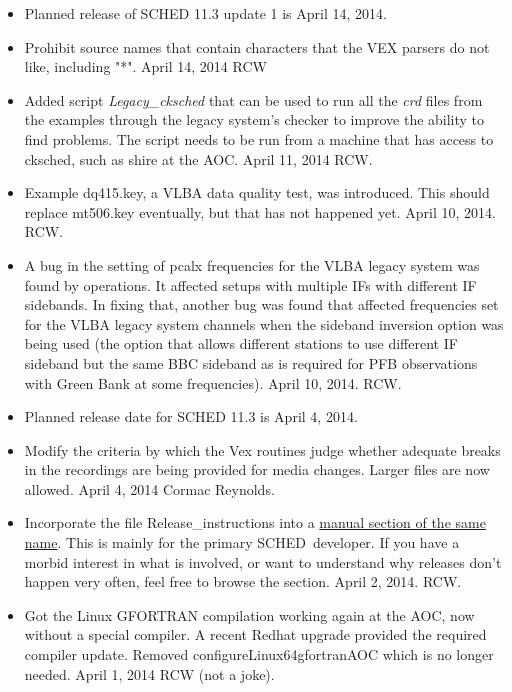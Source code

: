 \documentclass{report}
\newcommand{\schedb}{{\sc SCHED~}}
\begin{document}
\begin{itemize}

\item Planned release of SCHED 11.3 update 1 is April 14, 2014.

\item Prohibit source names that contain characters that the VEX
parsers do not like, including "*".  April 14, 2014  RCW

\item Added script {\sl Legacy\_cksched} that can be used to run all
the {\sl crd} files from the examples through the legacy system's
checker to improve the ability to find problems.  The script needs
to be run from a machine that has access to cksched, such as shire
at the AOC.  April 11, 2014 RCW.

\item Example dq415.key, a VLBA data quality test, was introduced.
This should replace mt506.key eventually, but that has not happened
yet. April 10, 2014.  RCW.

\item A bug in the setting of pcalx frequencies for the VLBA legacy
system was found by operations.  It affected setups with multiple IFs
with different IF sidebands.  In fixing that, another bug was found
that affected frequencies set for the VLBA legacy system channels when
the sideband inversion option was being used (the option that allows
different stations to use different IF sideband but the same BBC
sideband as is required for PFB observations with Green Bank at some
frequencies).  April 10, 2014.  RCW.

\item Planned release date for SCHED 11.3 is April 4, 2014.

\item Modify the criteria by which the Vex routines judge whether 
adequate breaks in the recordings are being provided for media changes.
Larger files are now allowed.  April 4, 2014  Cormac Reynolds.

\item Incorporate the file Release\_instructions into a
{\hyperref[SEC:RELEASE]{manual section of the same name}}.  This is mainly
for the primary \schedb developer.  If you have a morbid interest in 
what is involved, or want to understand why releases don't happen very
often, feel free to browse the section.  April 2, 2014.  RCW.

\item Got the Linux GFORTRAN compilation working again at the AOC, now
without a special compiler.  A recent Redhat upgrade provided the
required compiler update.  Removed configureLinux64gfortranAOC which is
no longer needed.  April 1, 2014  RCW  (not a joke). 


\end{itemize}
\end{document}

